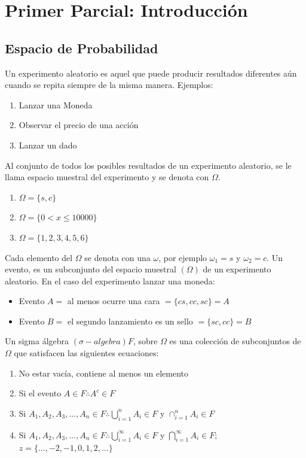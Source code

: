 \documentclass[11pt,fleqn]{book} %
\numberwithin{equation}{section} %
\numberwithin{figure}{section} %
\numberwithin{table}{section} %
\begin{document}
\chapterimage{} %
\chapter{Primer Parcial: Introducción}
\section{Espacio de Probabilidad}
Un experimento aleatorio es aquel que puede producir resultados diferentes aún cuando se repita siempre de la misma manera.
Ejemplos:
\begin{enumerate}
    \item Lanzar una Moneda
    \item Observar el precio de una acción
    \item Lanzar un dado
\end{enumerate}
Al conjunto de todos los posibles resultados de un experimento aleatorio, se le llama espacio muestral del experimento y se denota con $\Omega$.
\begin{enumerate}
    \item $\Omega = \{ s, c \}$
    \item $\Omega = \{ 0< x \leq 10000 \}$
    \item $\Omega = \{ 1,2,3,4,5,6 \}$
\end{enumerate}
Cada elemento del $\Omega$ se denota con una $\omega$, por ejemplo $\omega_{1} = s$ y $\omega_{2} = c$. Un evento, es un subconjunto del espacio muestral $(\Omega)$ de un experimento aleatorio. En el caso del experimento lanzar una moneda:
\begin{itemize}
    \item Evento $A =$ al menos ocurre una cara $= \{ cs,cc,sc \} = A$
    \item Evento $B =$ el  segundo lanzamiento es un sello $= \{ sc,cc \} = B$
\end{itemize}
Un sigma álgebra $(\sigma-algebra) F$, sobre $\Omega$ es una colección de subconjuntos de $\Omega$ que satisfacen las siguientes ecuaciones:
\begin{enumerate}
    \item No estar vacía, contiene al menos un elemento
    \item Si el evento $A \in F \therefore A^{c} \in F$
    \item Si $A_{1},A_{2},A_{3},...,A_{n} \in F \therefore 
    \bigcup_{i=1}^{n} A_{i} \in F$ y $\cap_{i=1}^{n} A_{i} \in F$
    \item Si $A_{1},A_{2},A_{3},...,A_{n} \in F \therefore 
    \bigcup_{i=1}^{\infty} A_{i} \in F$ y $\bigcap_{i=1}^{\infty} A_{i} \in F$; $z = \{ ...,-2,-1,0,1,2,... \}$
\end{enumerate}
\end{document}
